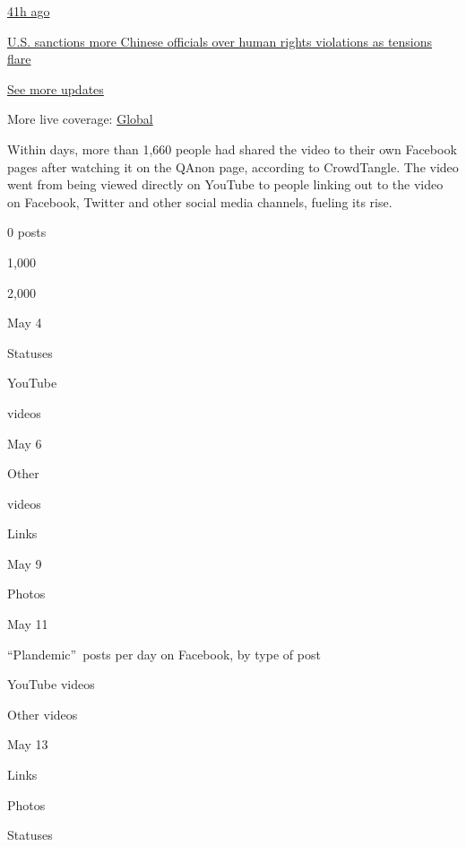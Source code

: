 \href{https://www.nytimes.com/live/2020/07/31/business/stock-market-today-coronavirus?action=click\&pgtype=Article\&state=default\&region=MAIN_CONTENT_1\&context=storylines_live_updates\#us-sanctions-more-chinese-officials-over-human-rights-violations-as-tensions-flare}{41h
ago}

\href{https://www.nytimes.com/live/2020/07/31/business/stock-market-today-coronavirus?action=click\&pgtype=Article\&state=default\&region=MAIN_CONTENT_1\&context=storylines_live_updates\#us-sanctions-more-chinese-officials-over-human-rights-violations-as-tensions-flare}{U.S.
sanctions more Chinese officials over human rights violations as
tensions flare}

\href{https://www.nytimes.com/live/2020/07/31/business/stock-market-today-coronavirus?action=click\&pgtype=Article\&state=default\&region=MAIN_CONTENT_1\&context=storylines_live_updates}{See
more updates}

More live coverage:
\href{https://www.nytimes.com/2020/08/01/world/coronavirus-covid-19.html?action=click\&pgtype=Article\&state=default\&region=MAIN_CONTENT_1\&context=storylines_live_updates}{Global}

Within days, more than 1,660 people had shared the video to their own
Facebook pages after watching it on the QAnon page, according to
CrowdTangle. The video went from being viewed directly on YouTube to
people linking out to the video on Facebook, Twitter and other social
media channels, fueling its rise.

0 posts

1,000

2,000

May 4

Statuses

YouTube

videos

May 6

Other

videos

Links

May 9

Photos

May 11

``Plandemic''~posts per day on Facebook, by type of post

YouTube videos

Other videos

May 13

Links

Photos

Statuses

